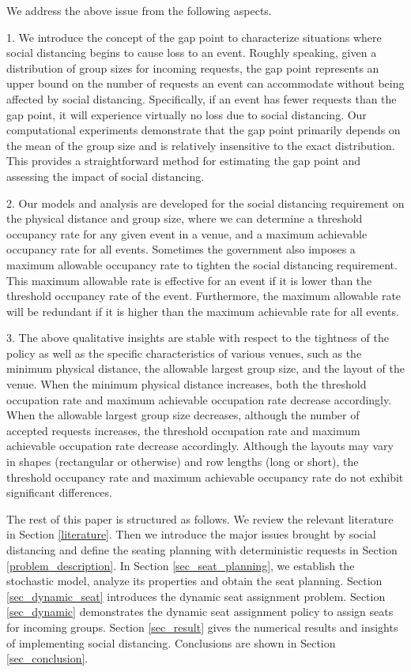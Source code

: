 We address the above issue from the following aspects.

1. We introduce the concept of the gap point to characterize situations where social distancing begins to cause loss to an event. Roughly speaking, given a distribution of group sizes for incoming requests, the gap point represents an upper bound on the number of requests an event can accommodate without being affected by social distancing. Specifically, if an event has fewer requests than the gap point, it will experience virtually no loss due to social distancing. Our computational experiments demonstrate that the gap point primarily depends on the mean of the group size and is relatively insensitive to the exact distribution. This provides a straightforward method for estimating the gap point and assessing the impact of social distancing.


2. Our models and analysis are developed for the social distancing requirement on the physical distance and group size, where we can determine a threshold occupancy rate for any given event in a venue, and a maximum achievable occupancy rate for all events. Sometimes the government also imposes a maximum allowable occupancy rate to tighten the social distancing requirement. This maximum allowable rate is effective for an event if it is lower than the threshold occupancy rate of the event. Furthermore, the maximum allowable rate will be redundant if it is higher than the maximum achievable rate for all events.

3. The above qualitative insights are stable with respect to the tightness of the policy as well as the specific characteristics of various venues, such as the minimum physical distance, the allowable largest group size, and the layout of the venue. When the minimum physical distance increases, both the threshold occupation rate and maximum achievable occupation rate decrease accordingly. When the allowable largest group size decreases, although the number of accepted requests increases, the threshold occupation rate and maximum achievable occupation rate decrease accordingly. Although the layouts may vary in shapes (rectangular or otherwise) and row lengths (long or short), the threshold occupancy rate and maximum achievable occupancy rate do not exhibit significant differences.


The rest of this paper is structured as follows. We review the relevant literature in Section \ref{literature}. Then we introduce the major issues brought by social distancing and define the seating planning with deterministic requests in Section \ref{problem_description}. In Section \ref{sec_seat_planning}, we establish the stochastic model, analyze its properties and obtain the seat planning. Section \ref{sec_dynamic_seat} introduces the dynamic seat assignment problem. Section \ref{sec_dynamic} demonstrates the dynamic seat assignment policy to assign seats for incoming groups. Section \ref{sec_result} gives the numerical results and insights of implementing social distancing. Conclusions are shown in Section \ref{sec_conclusion}.
\newpage
